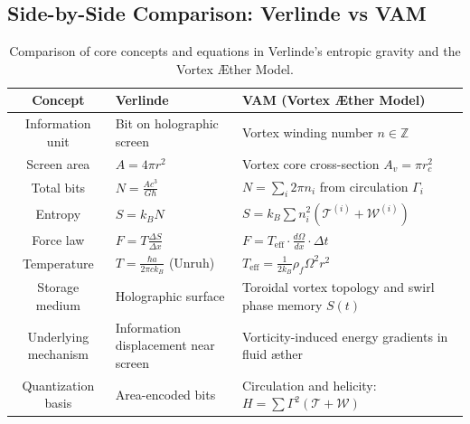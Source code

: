 \documentclass[preprint]{revtex4-2}
\begin{document}
            \subsection{Side-by-Side Comparison: Verlinde vs VAM}
            \begin{table}[H]
                \scriptsize
                \centering
                \renewcommand{\arraystretch}{1.3}
                \setlength{\tabcolsep}{10pt}
                \begin{tabular}{|c|p{5.0cm}|p{7cm}|}
                    \hline
                    \textbf{Concept} & \textbf{Verlinde} & \textbf{VAM (Vortex \AE ther Model)} \\
                    \hline
                    Information unit & Bit on holographic screen & Vortex winding number $n \in \mathbb{Z}$ \\
                    \hline
                    Screen area & $A = 4\pi r^2$ & Vortex core cross-section $A_v = \pi r_c^2$ \\
                    \hline
                    Total bits & $N = \frac{A c^3}{G \hbar}$ & $N = \sum_i 2\pi n_i$ from circulation $\Gamma_i$ \\
                    \hline
                    Entropy & $S = k_B N$ & $S = k_B \sum n_i^2 (\mathcal{T}^{(i)} + \mathcal{W}^{(i)})$ \\
                    \hline
                    Force law & $F = T \frac{\Delta S}{\Delta x}$ & $F = T_\text{eff} \cdot \frac{d\Omega}{dx} \cdot \Delta t$ \\
                    \hline
                    Temperature & $T = \frac{\hbar a}{2\pi c k_B}$ (Unruh) & $T_\text{eff} = \frac{1}{2k_B} \rho_{\scriptscriptstyle\boldsymbol\!f} \Omega^2 r^2$ \\
                    \hline
                    Storage medium & Holographic surface & Toroidal vortex topology and swirl phase memory $S(t)$ \\
                    \hline
                    Underlying mechanism & Information displacement near screen & Vorticity-induced energy gradients in fluid æther \\
                    \hline
                    Quantization basis & Area-encoded bits & Circulation and helicity: $H = \sum \Gamma^2(\mathcal{T} + \mathcal{W})$ \\
                    \hline
                \end{tabular}
                \caption{Comparison of core concepts and equations in Verlinde’s entropic gravity and the Vortex \AE ther Model.}
                \label{tab:table}
            \end{table}
\end{document}
